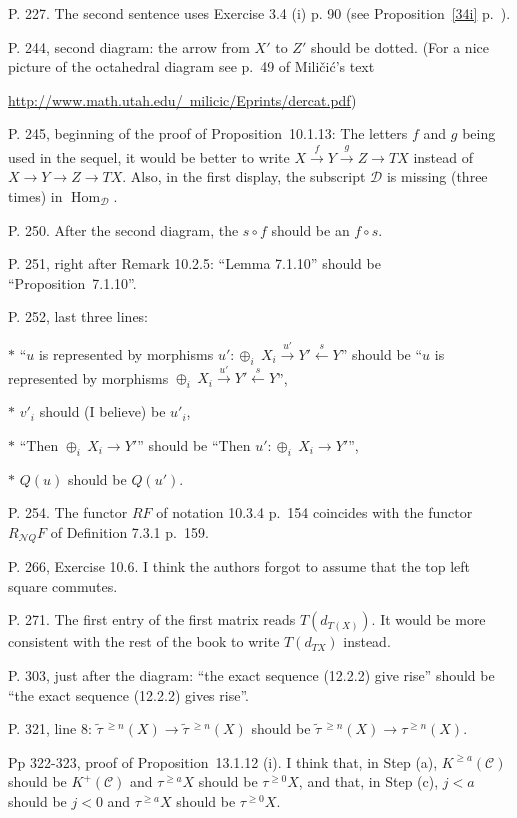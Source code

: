 \documentclass[12pt]{article}
\theoremstyle{remark}
\theoremstyle{definition}
\newcommand{\n}{\noindent}
\newcommand{\cc}{\mathcal}
\newcommand{\C}{\mathcal C}
\newcommand{\xr}{\xrightarrow}
\newcommand{\pr}{Proposition}
\DeclareMathOperator{\h}{Hom}
\begin{document}
\n P. 227. The second sentence uses Exercise 3.4 (i) p. 90 (see Proposition~\ref{34i} p.~\pageref{34i}). 

\n P. 244, second diagram: the arrow from $X'$ to $Z'$ should be dotted. (For a nice picture of the octahedral diagram see p.~49 of Mili\v{c}i\'c's text 

\href{http://www.math.utah.edu/~milicic/Eprints/dercat.pdf}{http://www.math.utah.edu/~milicic/Eprints/dercat.pdf})

\n P. 245, beginning of the proof of \pr\ 10.1.13: The letters $f$ and $g$ being used in the sequel, it would be better to write $X\xr fY\xr gZ\to TX$ instead of $X\to Y\to Z\to TX$. Also, in the first display, the subscript $\cc D$ is missing (three times) in $\h_{\cc D}$. 

\n P. 250. After the second diagram, the $s\circ f$ should be an $f\circ s$. 

\n P. 251, right after Remark 10.2.5: ``Lemma 7.1.10'' should be ``\pr\ 7.1.10''.

\n P. 252, last three lines: 

$*$ ``$u$ is represented by morphisms $u':\oplus_i\ X_i\xr{u'}Y'\xleftarrow sY$'' should be ``$u$ is represented by morphisms $\oplus_i\ X_i\xr{u'}Y'\xleftarrow sY$'', 

$*$ $v'_i$ should (I believe) be $u'_i$, 

$*$ ``Then $\oplus_i\ X_i\to Y'$'' should be ``Then $u':\oplus_i\ X_i\to Y'$'', 

$*$ $Q(u)$ should be $Q(u')$. 

\n P. 254. The functor $RF$ of notation 10.3.4 p.~154 coincides with the functor $R_{\cc NQ}F$ of Definition 7.3.1 p.~159.

\n P. 266, Exercise 10.6. I think the authors forgot to assume that the top left square commutes. 

\n P. 271. The first entry of the first matrix reads $T(d_{T(X)})$. It would be more consistent with the rest of the book to write $T(d_{TX})$ instead.

\n P. 303, just after the diagram: ``the exact sequence (12.2.2) give rise'' should be ``the exact sequence (12.2.2) gives rise''.

\n P. 321, line 8: $\widetilde\tau\,{}^{\ge n}(X)\to\widetilde\tau\,{}^{\ge n}(X)$ should be $\widetilde\tau\,{}^{\ge n}(X)\to\tau^{\ge n}(X)$.

\n Pp 322-323, proof of \pr\ 13.1.12 (i). I think that, in Step (a), $K^{\ge a}(\C)$ should be $K^+(\C)$ and $\tau^{\ge a}X$ should be $\tau^{\ge 0}X$, and that, in Step (c), $j<a$ should be $j<0$ and $\tau^{\ge a}X$ should be $\tau^{\ge 0}X$.
\end{document}
